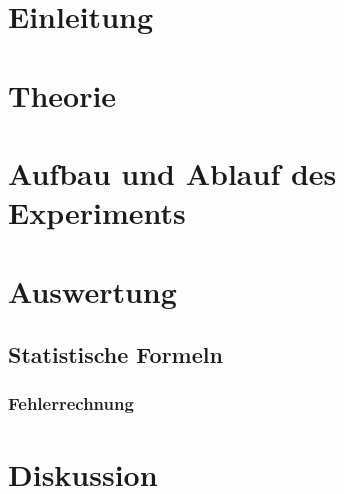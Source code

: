 \documentclass[a4,11pt]{article}
\newcommand{\V}{VXXX}
\begin{document}



\tableofcontents
\clearpage

\section{Einleitung}


\section{Theorie}

\clearpage


\section{Aufbau und Ablauf des Experiments}

\clearpage


\section{Auswertung}
\subsection{Statistische Formeln}
\subsubsection{Fehlerrechnung}
\label{sec:Fehlerrechnung}

%

\clearpage


\section{Diskussion}


\clearpage
\listoftodos
\listoffigures
\listoftables
\clearpage
\nocite{\V}
\printbibliography[title = Literaturverzeichnis]
\end{document}
